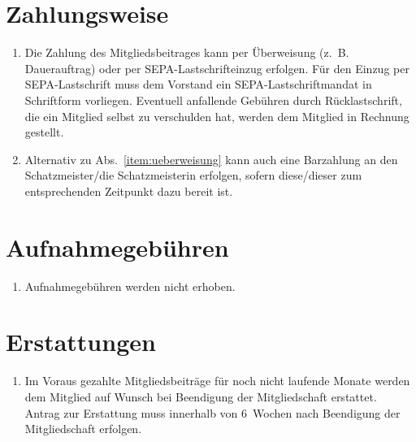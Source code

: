 \documentclass[a4paper,12pt]{scrartcl}
\begin{document}
\section{Zahlungsweise}
\begin{enumerate}
  \item\label{item:ueberweisung} Die Zahlung des Mitgliedsbeitrages kann per
    Überweisung (z.~B. Dauerauftrag) oder per SEPA-Lastschrifteinzug erfolgen.
    Für den Einzug per SEPA-Lastschrift muss dem Vorstand ein
    SEPA-Lastschriftmandat in Schriftform vorliegen. Eventuell anfallende
    Gebühren durch Rücklastschrift, die ein Mitglied selbst zu verschulden hat,
    werden dem Mitglied in Rechnung gestellt.
  \item Alternativ zu Abs.~\ref{item:ueberweisung} kann auch eine Barzahlung an
    den Schatzmeister/die Schatzmeisterin erfolgen, sofern diese/dieser zum 
    entsprechenden Zeitpunkt dazu bereit ist.
\end{enumerate}

\section{Aufnahmegebühren}
\begin{enumerate}
  \item Aufnahmegebühren werden nicht erhoben.
\end{enumerate}

\section{Erstattungen}
\begin{enumerate}
  \item Im Voraus gezahlte Mitgliedsbeiträge für noch nicht laufende Monate
    werden dem Mitglied auf Wunsch bei Beendigung der Mitgliedschaft erstattet.
	Antrag zur Erstattung muss innerhalb von 6~Wochen nach Beendigung der
	Mitgliedschaft erfolgen.
\end{enumerate}
\end{document}
